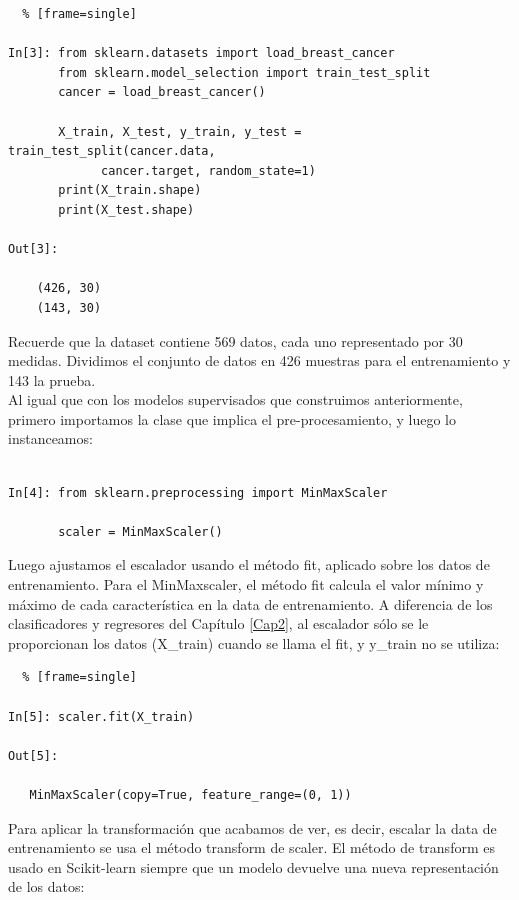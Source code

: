 \begin{lstlisting}  % [frame=single]	

In[3]: from sklearn.datasets import load_breast_cancer
       from sklearn.model_selection import train_test_split
       cancer = load_breast_cancer()
   
       X_train, X_test, y_train, y_test = train_test_split(cancer.data,
             cancer.target, random_state=1)
       print(X_train.shape)
       print(X_test.shape)

Out[3]:

    (426, 30)
    (143, 30)

\end{lstlisting}


Recuerde que la dataset  contiene 569  datos, cada uno representado 
por 30 medidas. Dividimos el conjunto de datos en 426 muestras para el  entrenamiento 
y 143 la prueba. \\

Al igual que con los modelos supervisados que construimos anteriormente, primero importamos la clase que implica el pre-procesamiento, y luego lo instanceamos:
 
\begin{lstlisting}

In[4]: from sklearn.preprocessing import MinMaxScaler
   
       scaler = MinMaxScaler()

\end{lstlisting}

Luego ajustamos el escalador usando el método  {\ttfamily fit}, aplicado sobre los datos de entrenamiento. Para  el {\ttfamily MinMaxscaler}, el método  {\ttfamily fit} calcula el valor mínimo y máximo de cada característica en la  data de entrenamiento. A diferencia de los clasificadores y regresores del Capítulo \ref{Cap2}, al escalador sólo se le proporcionan los datos {\ttfamily (X\_train)}  cuando se llama el {\ttfamily fit},  y   {\ttfamily y\_train} no se utiliza:


\begin{lstlisting}  % [frame=single]	
 
In[5]: scaler.fit(X_train)

Out[5]:

   MinMaxScaler(copy=True, feature_range=(0, 1))

\end{lstlisting}



Para aplicar la transformación que acabamos de ver,  es decir, escalar la data de entrenamiento se usa
 el método {\ttfamily transform}   de  {\ttfamily scaler}.
 El método de {\ttfamily transform}  es  usado en  {\ttfamily Scikit-learn} siempre que un modelo devuelve una nueva representación de los datos:\\	
 

